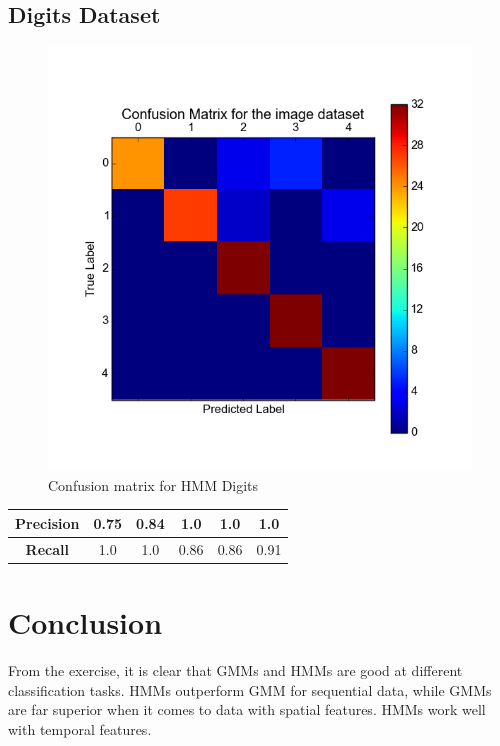 \documentclass[11pt,a4paper]{article}
\begin{document}
\subsection{Digits Dataset}
\begin{figure}[H]
  \centering
  \includegraphics[width=.8\linewidth]{Figures/confusion_digit_HMM.png}
\caption{Confusion matrix for HMM Digits}
  \label{fig:sfig1}
\end{figure}%
\begin{center}
\begin{tabular}{|c|c|c|c|c|c|}
\hline
\textbf{Precision} & 0.75 & 0.84 & 1.0 & 1.0 & 1.0 \\ \hline
\textbf{Recall} & 1.0 & 1.0 & 0.86 & 0.86 & 0.91 \\ \hline
\end{tabular}
\end{center}
\section{Conclusion}
From the exercise, it is clear that GMMs and HMMs are good at different classification tasks. HMMs outperform GMM for sequential data, while GMMs are far superior when it comes to data with spatial features. HMMs work well with temporal features.
\end{document}
